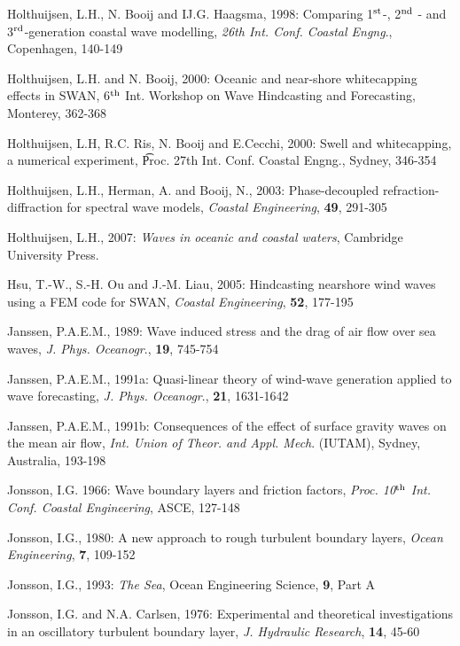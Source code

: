 \documentclass[12pt]{book}
\begin{document}
\begin{thebibliography}{10}
Holthuijsen, L.H., N. Booij and IJ.G. Haagsma, 1998: Comparing 1$^{{\rm st}}$-, 2$^{{\rm nd}}$ - and 3$^{{\rm rd}}$-generation
coastal wave modelling,  {\it 26th Int. Conf. Coastal Engng}., Copenhagen, 140-149

Holthuijsen, L.H. and N. Booij, 2000: Oceanic and near-shore whitecapping effects in SWAN, 6$^{{\rm th}}$ Int.
Workshop on Wave Hindcasting and Forecasting, Monterey, 362-368

Holthuijsen, L.H, R.C. Ris, N. Booij and E.Cecchi, 2000: Swell and whitecapping, a numerical experiment,
{\t Proc. 27th Int. Conf. Coastal Engng.}, Sydney, 346-354

Holthuijsen, L.H., Herman, A. and Booij, N., 2003: Phase-decoupled refraction-diffraction for
spectral wave models, {\it Coastal Engineering}, {\bf 49}, 291-305

Holthuijsen, L.H., 2007: {\it Waves in oceanic and coastal waters},
Cambridge University Press.

Hsu, T.-W., S.-H. Ou and J.-M. Liau, 2005: Hindcasting nearshore wind waves using a FEM code for SWAN,
{\it Coastal Engineering}, {\bf 52}, 177-195

Janssen, P.A.E.M., 1989: Wave induced stress and the drag of air flow over sea waves, {\it J. Phys.
Oceanogr}., {\bf 19}, 745-754

Janssen, P.A.E.M., 1991a: Quasi-linear theory of wind-wave generation applied to wave forecasting, {\it J.
Phys. Oceanogr}., {\bf 21}, 1631-1642

Janssen, P.A.E.M., 1991b: Consequences of the effect of surface gravity waves on the mean air flow, {\it Int.
Union of Theor. and Appl. Mech}. (IUTAM), Sydney, Australia, 193-198

Jonsson, I.G. 1966: Wave boundary layers and friction factors, {\it Proc. 10$^{{\rm th}}$ Int. Conf. Coastal Engineering},
ASCE, 127-148

Jonsson, I.G., 1980: A new approach to rough turbulent boundary layers, {\it Ocean Engineering}, {\bf 7}, 109-152

Jonsson, I.G., 1993: {\it The Sea}, Ocean Engineering Science, {\bf 9}, Part A

Jonsson, I.G. and N.A. Carlsen, 1976: Experimental and theoretical investigations in an oscillatory
turbulent boundary layer, {\it J. Hydraulic Research}, {\bf 14}, 45-60


\end{thebibliography}
\end{document}
